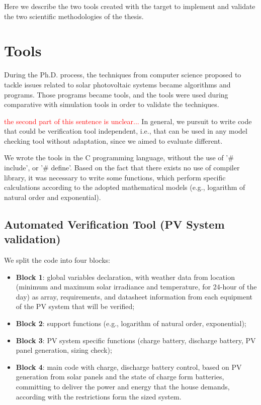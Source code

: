 Here we describe the two tools created with the target to implement and validate the two scientific methodologies of the thesis.

\section{Tools}

During the Ph.D. process, the techniques from computer science proposed to tackle issues related to solar photovoltaic systems became algorithms and programs. Those programs became tools, and the tools were used during comparative with simulation tools in order to validate the techniques.

\textcolor{red}{the second part of this sentence is unclear...} In general, we pursuit to write code that could be verification tool independent, i.e., that can be used in any model checking tool without adaptation, since we aimed to evaluate different.

We wrote the tools in the C programming language, without the use of '\# include', or '\# define'. Based on the fact that there exists no use of compiler library, it was necessary to write some functions, which perform specific calculations according to the adopted mathematical models (e.g., logarithm of natural order and exponential).

\subsection{Automated Verification Tool (PV System validation)}
\label{sec:automatedverification}

We split the code into four blocks:

\begin{itemize}
\item \textbf{Block 1}: global variables declaration, with weather data from location (minimum and maximum solar irradiance and temperature, for 24-hour of the day) as array, requirements, and datasheet information from each equipment of the PV system that will be verified; 

\item \textbf{Block 2}: support functions (e.g., logarithm of natural order, exponential);

\item \textbf{Block 3}: PV system specific functions (charge battery, discharge battery, PV panel generation, sizing check);

\item \textbf{Block 4}: main code with charge, discharge battery control, based on PV generation from solar panels and the state of charge form batteries, committing to deliver the power and energy that the house demands, according with the restrictions form the sized system.
\end{itemize}

